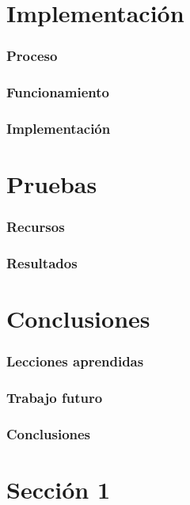 \documentclass{beamer}
\begin{document}
\section{Implementación}

\begin{frame}{}
    \frametitle{Proceso}
\end{frame}

\begin{frame}{}
    \frametitle{Funcionamiento}
\end{frame}

\begin{frame}{}
    \frametitle{Implementación}
\end{frame}

\section{Pruebas}

\begin{frame}{}
    \frametitle{Recursos}
\end{frame}

\begin{frame}{}
    \frametitle{Resultados}
\end{frame}

\section{Conclusiones}

\begin{frame}{}
    \frametitle{Lecciones aprendidas}
\end{frame}

\begin{frame}{}
    \frametitle{Trabajo futuro}
\end{frame}

\begin{frame}{}
    \frametitle{Conclusiones}
\end{frame}

\iffalse

\section{Sección 1} 
\end{document}
